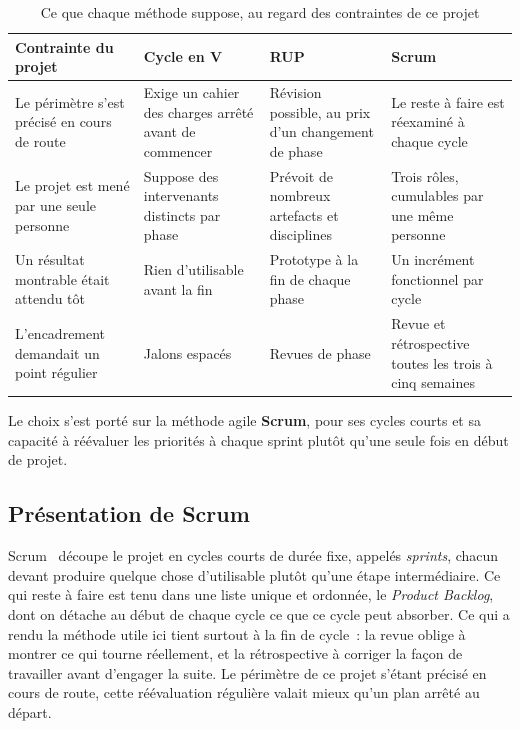 \begin{table}[H]
\centering
\caption{Ce que chaque méthode suppose, au regard des contraintes de ce projet}
\label{tab:comparatif-methodo}
\small
\begin{tabular}{L{3.3cm}L{3.5cm}L{3.5cm}L{3.7cm}}
\hline
{}
\textbf{Contrainte du projet} & \textbf{Cycle en V} & \textbf{RUP} & \textbf{Scrum} \\
\hline
Le périmètre s'est précisé en cours de route & Exige un cahier des charges arrêté avant de commencer
& Révision possible, au prix d'un changement de phase & Le reste à faire est réexaminé à chaque
cycle \\
\hline
Le projet est mené par une seule personne & Suppose des intervenants distincts par phase & Prévoit de
nombreux artefacts et disciplines & Trois rôles, cumulables par une même personne \\
\hline
Un résultat montrable était attendu tôt & Rien d'utilisable avant la fin & Prototype à la fin de
chaque phase & Un incrément fonctionnel par cycle \\
\hline
L'encadrement demandait un point régulier & Jalons espacés & Revues de phase & Revue et
rétrospective toutes les trois à cinq semaines \\
\hline
\end{tabular}
\end{table}

Le choix s'est porté sur la méthode agile \textbf{Scrum}, pour ses cycles courts et sa capacité à
réévaluer les priorités à chaque sprint plutôt qu'une seule fois en début de projet.

\subsection{Présentation de Scrum}

Scrum~\cite{schwaber20} découpe le projet en cycles courts de durée fixe, appelés \emph{sprints}, chacun devant
produire quelque chose d'utilisable plutôt qu'une étape intermédiaire. Ce qui reste à faire est tenu
dans une liste unique et ordonnée, le \emph{Product Backlog}, dont on détache au début de chaque
cycle ce que ce cycle peut absorber. Ce qui a rendu la méthode utile ici tient surtout à la fin de
cycle~: la revue oblige à montrer ce qui tourne réellement, et la rétrospective à corriger la façon
de travailler avant d'engager la suite. Le périmètre de ce projet s'étant précisé en cours de route,
cette réévaluation régulière valait mieux qu'un plan arrêté au départ.

